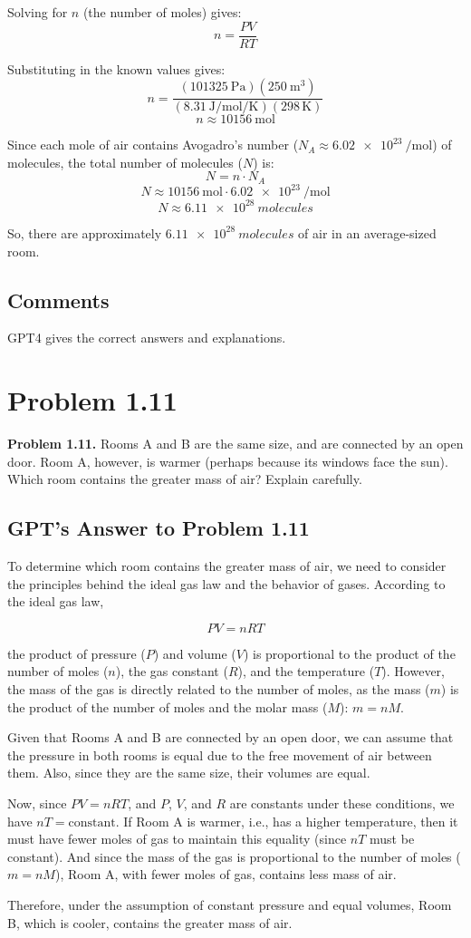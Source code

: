 \documentclass[12pt]{article}
\begin{document}
Solving for \(n\) (the number of moles) gives:
\[
n = \frac{PV}{RT}
\]

Substituting in the known values gives:
\[
n = \frac{(\SI{101325}{\pascal})(\SI{250}{\meter\cubed})}{(\SI{8.31}{\joule\per\mole\per\kelvin})(298 \, \text{K})}
\]
\[
n \approx \SI{10156}{\mole}
\]

Since each mole of air contains Avogadro's number (\(N_A \approx \SI{6.02e23}{\per\mole}\)) of molecules, the total number of molecules (\(N\)) is:
\[
N = n \cdot N_A
\]
\[
N \approx \SI{10156}{\mole} \cdot \SI{6.02e23}{\per\mole}
\]
\[
N \approx \SI{6.11e28}{molecules}
\]

So, there are approximately \(\SI{6.11e28}{molecules}\) of air in an average-sized room.

\subsection*{Comments}

GPT4 gives the correct answers and explanations.

\section*{Problem 1.11}

\textbf{Problem 1.11.} Rooms A and B are the same size, and are connected by an open door. Room A, however, is warmer (perhaps because its windows face the sun). Which room contains the greater mass of air? Explain carefully.

\subsection*{GPT's Answer to Problem 1.11}

To determine which room contains the greater mass of air, we need to consider the principles behind the ideal gas law and the behavior of gases. According to the ideal gas law, 

\[
PV = nRT
\]

the product of pressure (\(P\)) and volume (\(V\)) is proportional to the product of the number of moles (\(n\)), the gas constant (\(R\)), and the temperature (\(T\)). However, the mass of the gas is directly related to the number of moles, as the mass (\(m\)) is the product of the number of moles and the molar mass (\(M\)): \(m = nM\).

Given that Rooms A and B are connected by an open door, we can assume that the pressure in both rooms is equal due to the free movement of air between them. Also, since they are the same size, their volumes are equal. 

Now, since \(PV = nRT\), and \(P\), \(V\), and \(R\) are constants under these conditions, we have \(nT = \text{constant}\). If Room A is warmer, i.e., has a higher temperature, then it must have fewer moles of gas to maintain this equality (since \(nT\) must be constant). And since the mass of the gas is proportional to the number of moles (\(m = nM\)), Room A, with fewer moles of gas, contains less mass of air.

Therefore, under the assumption of constant pressure and equal volumes, Room B, which is cooler, contains the greater mass of air.
\end{document}
